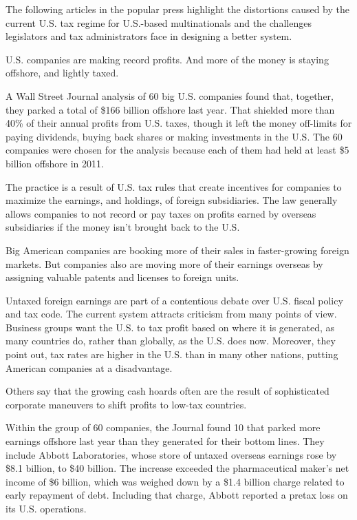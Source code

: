 The following articles in the popular press highlight the distortions caused by the current U.S. tax regime for U.S.-based multinationals and the challenges legislators and tax administrators face in designing a better system.  



\begin{select}


U.S. companies are making record profits. And more of the money is staying offshore, and lightly taxed.


A Wall Street Journal analysis of 60 big U.S. companies found that, together, they parked a total of \$166 billion offshore last year. That shielded more than 40\% of their annual profits from U.S. taxes, though it left the money off-limits for paying dividends, buying back shares or making investments in the U.S. The 60 companies were chosen for the analysis because each of them had held at least \$5 billion offshore in 2011.

The practice is a result of U.S. tax rules that create incentives for companies to maximize the earnings, and holdings, of foreign subsidiaries. The law generally allows companies to not record or pay taxes on profits earned by overseas subsidiaries if the money isn't brought back to the U.S.

Big American companies are booking more of their sales in faster-growing foreign markets. But companies also are moving more of their earnings overseas by assigning valuable patents and licenses to foreign units.

Untaxed foreign earnings are part of a contentious debate over U.S. fiscal policy and tax code. The current system attracts criticism from many points of view. Business groups want the U.S. to tax profit based on where it is generated, as many countries do, rather than globally, as the U.S. does now. Moreover, they point out, tax rates are higher in the U.S. than in many other nations, putting American companies at a disadvantage.

Others say that the growing cash hoards often are the result of sophisticated corporate maneuvers to shift profits to low-tax countries.

Within the group of 60 companies, the Journal found 10 that parked more earnings offshore last year than they generated for their bottom lines. They include Abbott Laboratories, whose store of untaxed overseas earnings rose by \$8.1 billion, to \$40 billion. The increase exceeded the pharmaceutical maker's net income of \$6 billion, which was weighed down by a \$1.4 billion charge related to early repayment of debt. Including that charge, Abbott reported a pretax loss on its U.S. operations.


\end{select}
